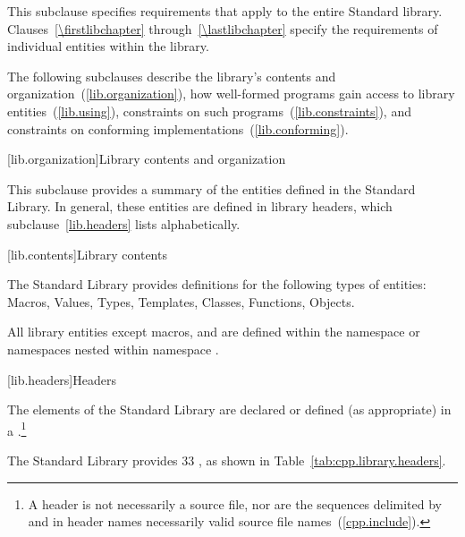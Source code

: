 \pnum
This subclause specifies requirements that apply to the entire \Cpp Standard library.
Clauses~\ref{\firstlibchapter} through~\ref{\lastlibchapter}
specify the requirements of individual entities within the library.

\pnum
The following subclauses describe the library's contents and
organization~(\ref{lib.organization}), how well-formed \Cpp programs gain
access to library entities~(\ref{lib.using}),
constraints on such programs~(\ref{lib.constraints}), and
constraints on conforming implementations~(\ref{lib.conforming}).

[lib.organization]{Library contents and organization}

\pnum
This subclause provides a summary of the entities defined in the
\Cpp Standard Library.
In general, these entities are defined in library headers, which
subclause~\ref{lib.headers} lists alphabetically.

[lib.contents]{Library contents}

\pnum
The \Cpp Standard Library provides definitions for the following types of entities:
Macros, Values, Types, Templates, Classes, Functions, Objects.

\pnum
All library entities except macros,
and
are defined within the namespace
or namespaces nested within namespace
.

[lib.headers]{Headers}

\pnum
The elements of the \Cpp Standard Library are declared or defined (as appropriate) in a
.\footnote{A header is not necessarily a source file, nor are the
sequences delimited by \tcode{<} and \tcode{>} in header names necessarily valid source
file names~(\ref{cpp.include}). }

\pnum
The \Cpp Standard Library provides
33
,
%
as shown in Table~\ref{tab:cpp.library.headers}.

